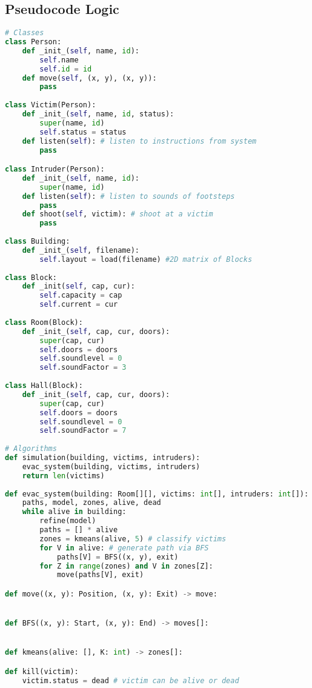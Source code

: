 \documentclass[12pt]{article}
\begin{document}
\subsection*{Pseudocode Logic}
\begin{lstlisting}[language=python]
# Classes
class Person:
	def _init_(self, name, id):
		self.name
		self.id = id
	def move(self, (x, y), (x, y)):
		pass
		
class Victim(Person):
	def _init_(self, name, id, status):
		super(name, id)
		self.status = status
	def listen(self): # listen to instructions from system
		pass

class Intruder(Person):
	def _init_(self, name, id):
		super(name, id)
	def listen(self): # listen to sounds of footsteps
		pass
	def shoot(self, victim): # shoot at a victim
		pass
		
class Building:
	def _init_(self, filename):
		self.layout = load(filename) #2D matrix of Blocks
		
class Block:
	def _init(self, cap, cur):
		self.capacity = cap
		self.current = cur
		
class Room(Block):
	def _init_(self, cap, cur, doors):
		super(cap, cur)
		self.doors = doors
		self.soundlevel = 0 
		self.soundFactor = 3
		
class Hall(Block):
	def _init_(self, cap, cur, doors):
		super(cap, cur)
		self.doors = doors
		self.soundlevel = 0 
		self.soundFactor = 7
		
# Algorithms
def simulation(building, victims, intruders):
	evac_system(building, victims, intruders)
	return len(victims)
	
def evac_system(building: Room[][], victims: int[], intruders: int[]):
	paths, model, zones, alive, dead
	while alive in building: 
		refine(model)
		paths = [] * alive
		zones = kmeans(alive, 5) # classify victims
		for V in alive: # generate path via BFS
			paths[V] = BFS((x, y), exit) 
		for Z in range(zones) and V in zones[Z]:
			move(paths[V], exit)

def move((x, y): Position, (x, y): Exit) -> move:


def BFS((x, y): Start, (x, y): End) -> moves[]:


def kmeans(alive: [], K: int) -> zones[]:

def kill(victim):
	victim.status = dead # victim can be alive or dead

\end{lstlisting}
\end{document}
